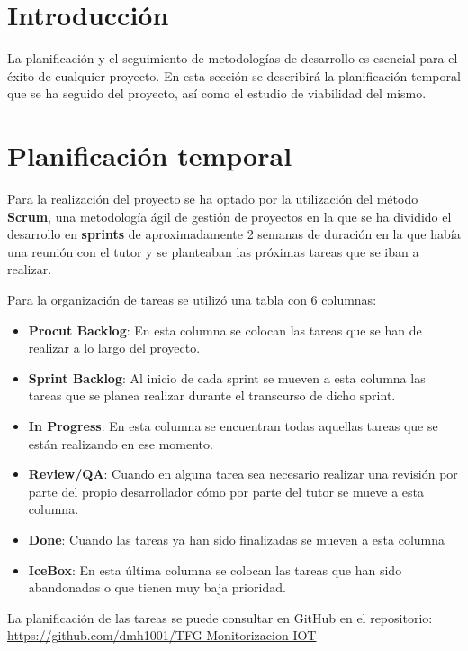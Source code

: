 
\section{Introducción}

La planificación y el seguimiento de metodologías de desarrollo es esencial para el éxito de cualquier proyecto. En esta sección se describirá la planificación temporal que se ha seguido del proyecto, así como el estudio de viabilidad del mismo.

\section{Planificación temporal}

Para la realización del proyecto se ha optado por la utilización del método \textbf{Scrum}, una metodología ágil de gestión de proyectos en la  que se ha dividido el desarrollo en \textbf{sprints} de aproximadamente 2 semanas de duración en la que había una reunión con el tutor y se planteaban las próximas tareas que se iban a realizar.

Para la organización de tareas se utilizó una tabla con 6 columnas:

\begin{itemize}
    \item \textbf{Procut Backlog}: En esta columna se colocan las tareas que se han de realizar a lo largo del proyecto.
    \item \textbf{Sprint Backlog}: Al inicio de cada sprint se mueven a esta columna las tareas que se planea realizar durante el transcurso de dicho sprint.
    \item \textbf{In Progress}: En esta columna se encuentran todas aquellas tareas que se están realizando en ese momento.
    \item \textbf{Review/QA}: Cuando en alguna tarea sea necesario realizar una revisión por parte del propio desarrollador cómo por parte del tutor se mueve a esta columna.
    \item \textbf{Done}: Cuando las tareas ya han sido finalizadas se mueven a esta columna
    \item \textbf{IceBox}: En esta última columna se colocan las tareas que han sido abandonadas o que tienen muy baja prioridad.
\end{itemize}


La planificación de las tareas se puede consultar en GitHub en el repositorio: \url{https://github.com/dmh1001/TFG-Monitorizacion-IOT}

